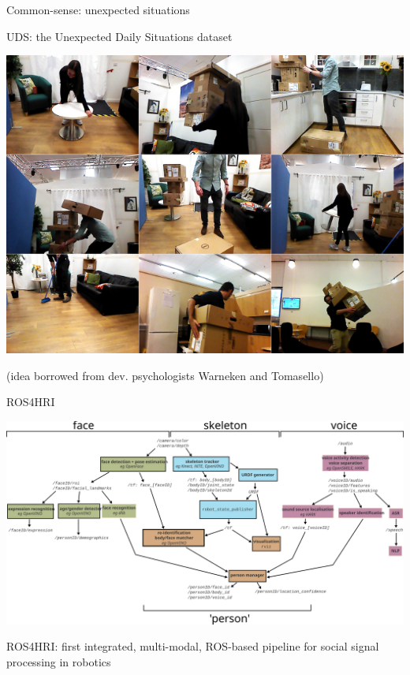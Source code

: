 \documentclass[xcolor=table]{beamer}
\begin{document}
{

\begin{frame}{Common-sense: unexpected situations}
    \begin{center}

        UDS: the Unexpected Daily Situations dataset


        \includegraphics[width=0.7\linewidth]{uds/mosaic}

        {\scriptsize (idea borrowed from dev. psychologists Warneken and
        Tomasello)}

    \end{center}

\end{frame}
}


{


\begin{frame}{ROS4HRI}
    \begin{center}
        \includegraphics[width=\columnwidth]{architectures/ros4hri-pipeline}
    \end{center}
    ROS4HRI: first integrated, multi-modal, ROS-based pipeline for social signal
    processing in robotics

\end{frame}
}
\end{document}
